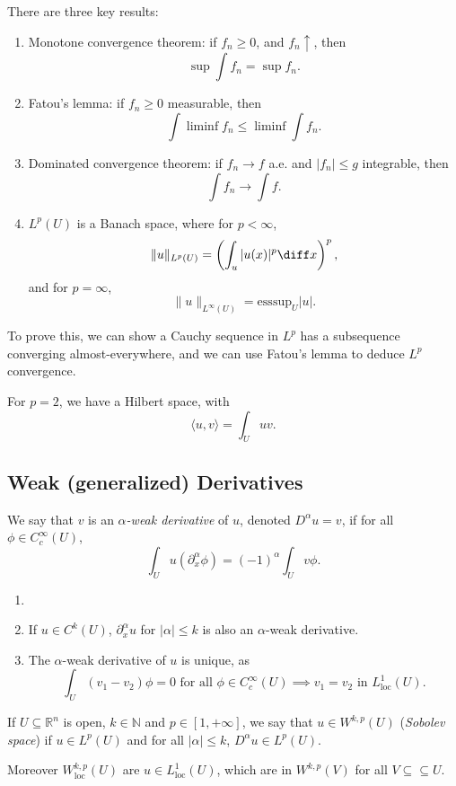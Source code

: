 \documentclass[12pt]{article}
\begin{document}
There are three key results:

\begin{enumerate}
	\item Monotone convergence theorem: if $f_n \geq 0$, and $f_n \uparrow$, then
		\[
		\sup \int f_n = \sup f_n.
		\]
	\item Fatou's lemma: if $f_n \geq 0$ measurable, then
		\[
		\int \liminf f_n \leq \liminf \int f_n.
		\]
	\item Dominated convergence theorem: if $f_n \to f$ a.e. and $|f_n| \leq g$ integrable, then
		\[
		\int f_n \to \int f.
		\]
	\item $L^p(U)$ is a Banach space, where for $p < \infty$,
		\[
		\|u\|_{L^p(U)} = \left( \int_u |u(x)|^p \diff x \right)^p,
		\]
		and for $p = \infty$,
		\[
		\|u\|_{L^\infty(U)} = \mathrm{esssup}_U |u|.
		\]
\end{enumerate}

To prove this, we can show a Cauchy sequence in $L^p$ has a subsequence converging almost-everywhere, and we can use Fatou's lemma to deduce $L^p$ convergence.

For $p = 2$, we have a Hilbert space, with
\[
\langle u, v\rangle = \int_U u v.
\]

\subsection{Weak (generalized) Derivatives}%
\label{sub:wd}

We say that $v$ is an \emph{$\alpha$-weak derivative} of $u$, denoted $D^\alpha u = v$, if for all $\phi \in C^{\infty}_c(U)$,
\[
\int_U u (\partial^{\alpha}_x \phi) = (-1)^{\alpha} \int_U v \phi.
\]
\begin{remark}
	\begin{enumerate}
		\item[]
		\item If $u \in C^{k}(U)$, $\partial^{\alpha}_x u$ for $|\alpha| \leq k$ is also an $\alpha$-weak derivative.
		\item The $\alpha$-weak derivative of $u$ is unique, as
			\[
				\int_U (v_1 - v_2) \phi = 0 \text{ for all }\phi \in C^{\infty}_c(U) \implies v_1 = v_2 \text{ in } L^{1}_{\mathrm{loc}}(U).
			\]
	\end{enumerate}
\end{remark}

\begin{definition}
	If $U \subseteq \mathbb{R}^n$ is open, $k \in \mathbb{N}$ and $p \in [1, +\infty]$, we say that $u \in W^{k, p}(U)$ (\emph{Sobolev space}) if $u \in L^p(U)$ and for all $|\alpha| \leq k$, $D^\alpha u \in L^p(U)$.

	Moreover $W^{k, p}_{\mathrm{loc}}(U)$ are $u \in L^1_{\mathrm{loc}}(U)$, which are in $W^{k, p}(V)$ for all $V \subseteq \subseteq U$.
\end{definition}
\end{document}
